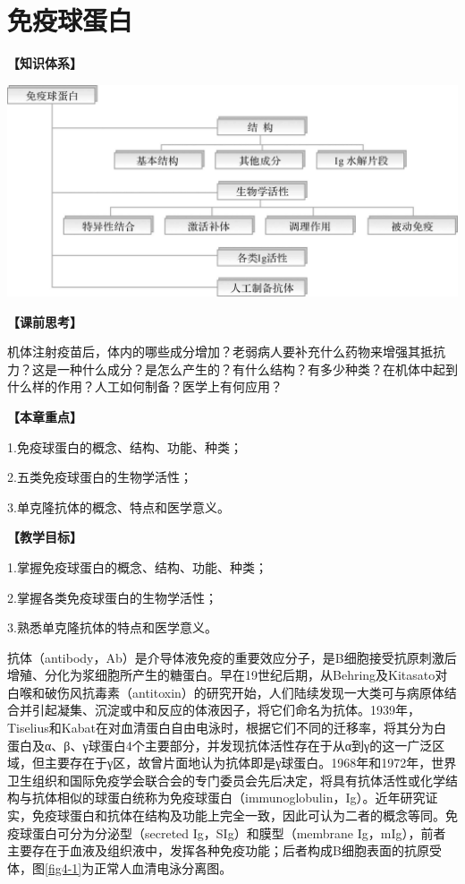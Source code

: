 \chapter{免疫球蛋白}
\begin{framed}
\noindent\textbf{【知识体系】}
\begin{center}
\includegraphics{./images/Image00060.jpg}
\end{center}
\noindent\textbf{【课前思考】}

机体注射疫苗后，体内的哪些成分增加？老弱病人要补充什么药物来增强其抵抗力？这是一种什么成分？是怎么产生的？有什么结构？有多少种类？在机体中起到什么样的作用？人工如何制备？医学上有何应用？

\noindent\textbf{【本章重点】}

1.免疫球蛋白的概念、结构、功能、种类；

2.五类免疫球蛋白的生物学活性；

3.单克隆抗体的概念、特点和医学意义。

\noindent\textbf{【教学目标】}

1.掌握免疫球蛋白的概念、结构、功能、种类；

2.掌握各类免疫球蛋白的生物学活性；

3.熟悉单克隆抗体的特点和医学意义。
\end{framed}

抗体（antibody，Ab）是介导体液免疫的重要效应分子，是B细胞接受抗原刺激后增殖、分化为浆细胞所产生的糖蛋白。早在19世纪后期，从Behring及Kitasato对白喉和破伤风抗毒素（antitoxin）的研究开始，人们陆续发现一大类可与病原体结合并引起凝集、沉淀或中和反应的体液因子，将它们命名为抗体。1939年，Tiselius和Kabat在对血清蛋白自由电泳时，根据它们不同的迁移率，将其分为白蛋白及α、β、γ球蛋白4个主要部分，并发现抗体活性存在于从α到γ的这一广泛区域，但主要存在于γ区，故曾片面地认为抗体即是γ球蛋白。1968年和1972年，世界卫生组织和国际免疫学会联合会的专门委员会先后决定，将具有抗体活性或化学结构与抗体相似的球蛋白统称为免疫球蛋白（immunoglobulin，Ig）。近年研究证实，免疫球蛋白和抗体在结构及功能上完全一致，因此可认为二者的概念等同。免疫球蛋白可分为分泌型（secreted
Ig，SIg）和膜型（membrane
Ig，mIg），前者主要存在于血液及组织液中，发挥各种免疫功能；后者构成B细胞表面的抗原受体，图\ref{fig4-1}为正常人血清电泳分离图。

